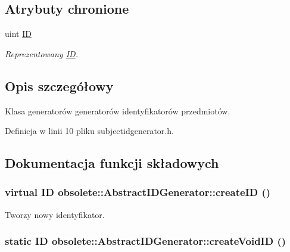 \subsection*{Atrybuty chronione}
\begin{DoxyCompactItemize}
\item 
uint \hyperlink{classobsolete_1_1AbstractID_a5f67fa1c7d96085f0ef41193b60b570c}{ID}
\begin{DoxyCompactList}\small\item\em Reprezentowany \hyperlink{classobsolete_1_1ID}{ID}. \item\end{DoxyCompactList}\end{DoxyCompactItemize}


\subsection{Opis szczegółowy}
Klasa generatorów generatorów identyfikatorów przedmiotów. 

Definicja w linii 10 pliku subjectidgenerator.h.



\subsection{Dokumentacja funkcji składowych}
\hypertarget{classobsolete_1_1AbstractIDGenerator_a39d2f0147e3a028fef8299770e23db90}{
\subsubsection[{createID}]{\setlength{\rightskip}{0pt plus 5cm}virtual {\bf ID} obsolete::AbstractIDGenerator::createID ()}}
\label{classobsolete_1_1AbstractIDGenerator_a39d2f0147e3a028fef8299770e23db90}


Tworzy nowy identyfikator. 

\hypertarget{classobsolete_1_1AbstractIDGenerator_a330da88ba80820ca6ce0a29cbbab9e1b}{
\subsubsection[{createVoidID}]{\setlength{\rightskip}{0pt plus 5cm}static {\bf ID} obsolete::AbstractIDGenerator::createVoidID ()}}
\label{classobsolete_1_1AbstractIDGenerator_a330da88ba80820ca6ce0a29cbbab9e1b}


